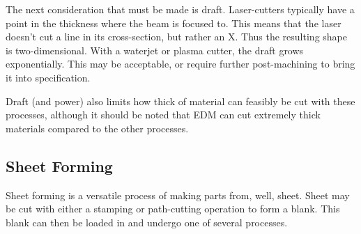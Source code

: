 \documentclass[10pt,letterpaper]{book}
\begin{document}
  The next consideration that must be made is draft. Laser-cutters typically have a point in the thickness where the beam is focused to. This means that the laser doesn't cut a line in its cross-section, but rather an X. Thus the resulting shape is two-dimensional. With a waterjet or plasma cutter, the draft grows exponentially. This may be acceptable, or require further post-machining to bring it into specification.
 
 Draft (and power) also limits how thick of material can feasibly be cut with these processes, although it should be noted that EDM can cut extremely thick materials compared to the other processes.
 
 \subsection{Sheet Forming}
 
 Sheet forming is a versatile process of making parts from, well, sheet. Sheet may be cut with either a stamping or path-cutting operation to form a blank. This blank can then be loaded in and undergo one of several processes.
 
\end{document}
